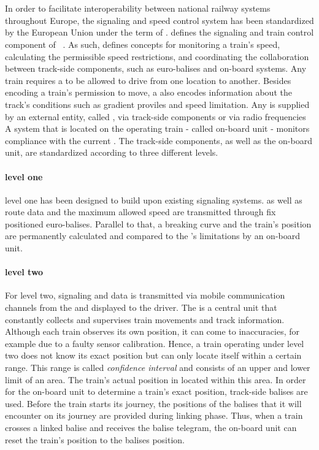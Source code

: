 \section{}
In order to facilitate interoperability between national railway systems throughout Europe, the signaling and speed control system has been standardized by the European Union under the term of .
 defines the signaling and train control component of ~\cite{ETCS26}.
As such,  defines concepts for monitoring a train's speed, calculating the permissible speed restrictions, and coordinating the collaboration between track-side components, such as  euro-balises and on-board systems.
Any train requires a  to be allowed to drive from one location to another.
Besides encoding a train's permission to move, a  also encodes information about the track's conditions such as gradient proviles and speed limitation.
Any  is supplied by an external entity, called , via track-side components or via radio frequencies
A system that is located on the operating train - called on-board unit - monitors compliance with the current .
The track-side components, as well as the on-board unit, are standardized according to three different  levels.

\paragraph{ level one}
 level one has been designed to build upon existing signaling systems.
 as well as route data and the maximum allowed speed are transmitted through fix positioned euro-balises.
Parallel to that, a breaking curve and the train's position are permanently calculated and compared to the 's limitations by an on-board unit.

\paragraph{ level two}
For  level two, signaling and  data is transmitted via mobile communication channels from the  and displayed to the driver.
The  is a central unit that constantly collects and supervises train movements and track information.
Although each train observes its own position, it can come to inaccuracies, for example due to a faulty sensor calibration.
Hence, a train operating under  level two does not know its exact position but can only locate itself within a certain range.
This range is called \textit{confidence interval} and consists of an upper and lower limit of an area.
The train's actual position in located within this area.
In order for the on-board unit to determine a train's exact position, track-side balises are used.
Before the train starts its journey, the positions of the balises that it will encounter on its journey are provided during linking phase.
Thus, when a train crosses a linked balise and receives the balise telegram, the on-board unit can reset the train's position to the balises position.

